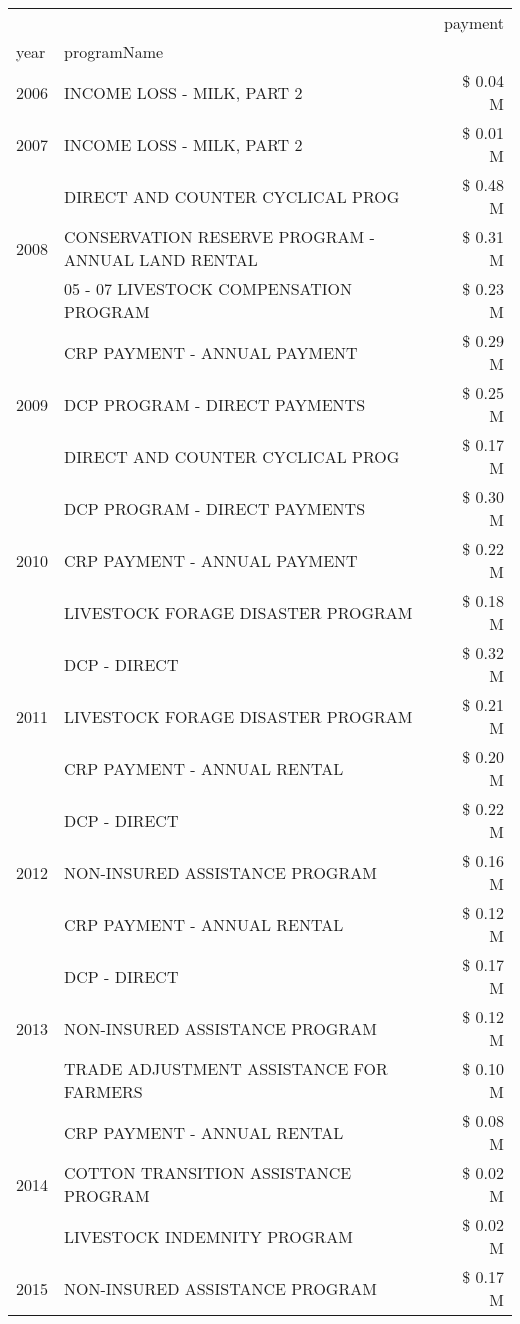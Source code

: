 \begin{tabular}{llr}
\toprule
 &  & payment \\
year & programName &  \\
\midrule
2006 & INCOME LOSS - MILK, PART 2 & \$ 0.04 M \\
\cline{1-3}
2007 & INCOME LOSS - MILK, PART 2 & \$ 0.01 M \\
\cline{1-3}
\multirow[t]{3}{*}{2008} & DIRECT AND COUNTER CYCLICAL PROG & \$ 0.48 M \\
 & CONSERVATION RESERVE PROGRAM - ANNUAL LAND RENTAL & \$ 0.31 M \\
 & 05 - 07 LIVESTOCK COMPENSATION PROGRAM & \$ 0.23 M \\
\cline{1-3}
\multirow[t]{3}{*}{2009} & CRP PAYMENT - ANNUAL PAYMENT & \$ 0.29 M \\
 & DCP PROGRAM - DIRECT PAYMENTS & \$ 0.25 M \\
 & DIRECT AND COUNTER CYCLICAL PROG & \$ 0.17 M \\
\cline{1-3}
\multirow[t]{3}{*}{2010} & DCP PROGRAM - DIRECT PAYMENTS & \$ 0.30 M \\
 & CRP PAYMENT - ANNUAL PAYMENT & \$ 0.22 M \\
 & LIVESTOCK FORAGE DISASTER  PROGRAM & \$ 0.18 M \\
\cline{1-3}
\multirow[t]{3}{*}{2011} & DCP - DIRECT & \$ 0.32 M \\
 & LIVESTOCK FORAGE DISASTER PROGRAM & \$ 0.21 M \\
 & CRP PAYMENT - ANNUAL RENTAL & \$ 0.20 M \\
\cline{1-3}
\multirow[t]{3}{*}{2012} & DCP - DIRECT & \$ 0.22 M \\
 & NON-INSURED ASSISTANCE PROGRAM & \$ 0.16 M \\
 & CRP PAYMENT - ANNUAL RENTAL & \$ 0.12 M \\
\cline{1-3}
\multirow[t]{3}{*}{2013} & DCP - DIRECT & \$ 0.17 M \\
 & NON-INSURED ASSISTANCE PROGRAM & \$ 0.12 M \\
 & TRADE ADJUSTMENT ASSISTANCE FOR FARMERS & \$ 0.10 M \\
\cline{1-3}
\multirow[t]{3}{*}{2014} & CRP PAYMENT - ANNUAL RENTAL & \$ 0.08 M \\
 & COTTON TRANSITION ASSISTANCE PROGRAM & \$ 0.02 M \\
 & LIVESTOCK INDEMNITY PROGRAM & \$ 0.02 M \\
\cline{1-3}
\multirow[t]{3}{*}{2015} & NON-INSURED ASSISTANCE PROGRAM & \$ 0.17 M \\

\end{tabular}
